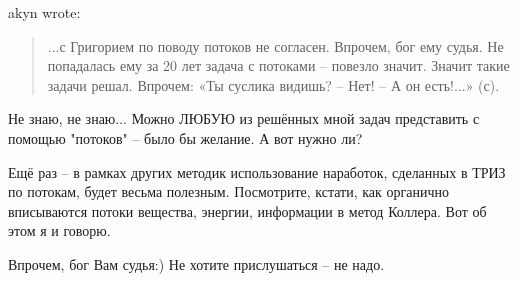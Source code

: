 \documentclass[a4paper,11pt]{article}
\begin{document}
akyn wrote:
\begin{quote}
  ...с Григорием по поводу потоков не согласен. Впрочем, бог ему судья. Не
  попадалась ему за 20 лет задача с потоками – повезло значит. Значит такие
  задачи решал. Впрочем: «Ты суслика видишь? – Нет! – А он есть!...» (с).
\end{quote}
Не знаю, не знаю...  Можно ЛЮБУЮ из решённых мной задач представить с помощью
"потоков" {--} было бы желание.  А вот нужно ли?

Ещё раз -- в рамках других методик использование наработок, сделанных в ТРИЗ
по потокам, будет весьма полезным.  Посмотрите, кстати, как органично
вписываются потоки вещества, энергии, информации в метод Коллера.  Вот об этом
я и говорю.

Впрочем, бог Вам судья:)
Не хотите прислушаться -- не надо.
\end{document}
